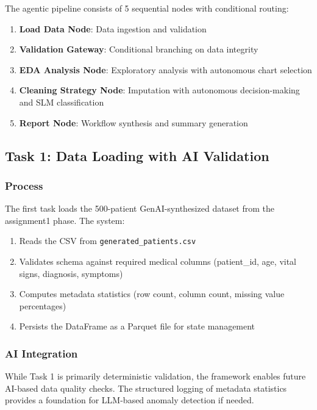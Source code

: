 \documentclass[10pt,a4paper]{article}
\begin{document}
The agentic pipeline consists of 5 sequential nodes with conditional routing:

\begin{enumerate}
    \item \textbf{Load Data Node}: Data ingestion and validation
    \item \textbf{Validation Gateway}: Conditional branching on data integrity
    \item \textbf{EDA Analysis Node}: Exploratory analysis with autonomous chart selection
    \item \textbf{Cleaning Strategy Node}: Imputation with autonomous decision-making and SLM classification
    \item \textbf{Report Node}: Workflow synthesis and summary generation
\end{enumerate}

\subsection{Task 1: Data Loading with AI Validation}

\subsubsection{Process}

The first task loads the 500-patient GenAI-synthesized dataset from the assignment1 phase. The system:
\begin{enumerate}
    \item Reads the CSV from \texttt{generated\_patients.csv}
    \item Validates schema against required medical columns (patient\_id, age, vital signs, diagnosis, symptoms)
    \item Computes metadata statistics (row count, column count, missing value percentages)
    \item Persists the DataFrame as a Parquet file for state management
\end{enumerate}

\subsubsection{AI Integration}

While Task 1 is primarily deterministic validation, the framework enables future AI-based data quality checks. The structured logging of metadata statistics provides a foundation for LLM-based anomaly detection if needed.
\end{document}
